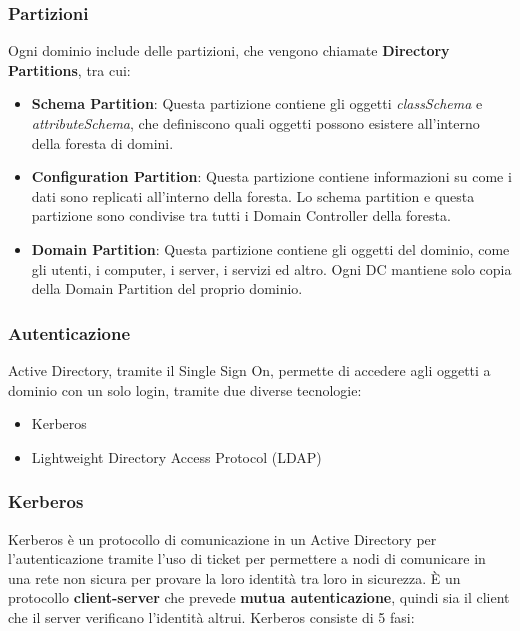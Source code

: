 \documentclass{article}
\begin{document}
\subsubsection{Partizioni}
Ogni dominio include delle partizioni, che vengono chiamate \textbf{Directory Partitions}, tra cui:
\begin{itemize}
    \item \textbf{Schema Partition}: Questa partizione contiene gli oggetti \textit{classSchema} e \textit{attributeSchema}, che definiscono quali oggetti possono esistere all’interno della foresta di domini.

    \item \textbf{Configuration Partition}: Questa partizione contiene  informazioni su come i dati sono replicati all’interno della foresta.
    Lo schema partition e questa partizione sono condivise tra tutti i Domain Controller della foresta.

    \item \textbf{Domain Partition}: Questa partizione contiene gli oggetti del dominio, come gli utenti, i computer, i server, i servizi ed altro. Ogni DC mantiene solo copia della Domain Partition del proprio dominio.
\end{itemize}

\subsubsection{Autenticazione}
Active Directory, tramite il Single Sign On, permette di accedere agli oggetti a dominio con un solo login, tramite due diverse tecnologie:
\begin{itemize}
    \item Kerberos
    \item Lightweight Directory Access Protocol (LDAP)
\end{itemize}

\subsubsection{Kerberos}
Kerberos è un protocollo di comunicazione in un Active Directory per l'autenticazione tramite l'uso di ticket per permettere a nodi di comunicare in una rete non sicura per provare la loro identità tra loro in sicurezza. È un protocollo \textbf{client-server} che prevede \textbf{mutua autenticazione}, quindi sia il client che il server verificano l'identità altrui. Kerberos consiste di 5 fasi:
\end{document}
